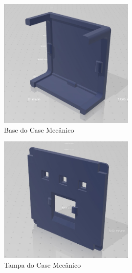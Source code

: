 \documentclass[../monografia.tex]{subfiles}
\begin{document}
\begin{figure}[h]
	\centering
	\includegraphics[width=0.6\textwidth]{mec-base.jpeg}
	\caption{Base do Case Mecânico}
	\label{fig:mec1}
\end{figure}

\begin{figure}[h]
	\centering
	\includegraphics[width=0.6\textwidth]{mec-tampa.jpeg}
	\caption{Tampa do Case Mecânico}
	\label{fig:mec2}
\end{figure}

\end{document}
